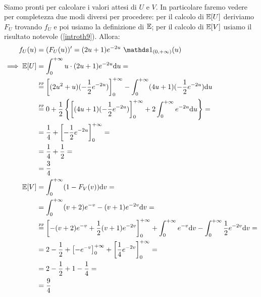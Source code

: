 \begin{enumerate}
\begin{gather*}
\end{gather*}
Siamo pronti per calcolare i valori attesi di $U$ e $V$. In particolare faremo vedere per completezza due modi diversi per procedere: per il calcolo di $\mathbb{E}[U]$ deriviamo $F_U$ trovando $f_U$ e poi usiamo la definizione di $\mathbb{E}$; per il calcolo di $\mathbb{E}[V]$ usiamo il risultato notevole (\ref{introth9}). Allora:
\begin{gather*}
\begin{aligned}
f_U(u)&=(F_U(u))'=(2u+1)e^{-2u}\ \Ind_{(0,+\infty)}(u) \\
\implies \EE[U]&=\int_{0}^{+\infty} u\cdot (2u+1)e^{-2u}\du =\\
&\overset{\underset{pp}{}}{=}\left[(2u^2+u)(-\frac{1}{2}e^{-2u})   \right]_0^{+\infty} -\int_{0}^{+\infty} (4u+1)(-\frac{1}{2}e^{-2u})\du \\
&\overset{\underset{pp}{}}{=}0+\frac{1}{2}\left\{\left[(4u+1)(-\frac{1}{2}e^{-2u})  \right]_0^{+\infty}+2\int_{0}^{+\infty} e^{-2u}\du   \right\}=\\
&=\frac{1}{4}+\left[ -\frac{1}{2}e^{-2u} \right]_0^{+\infty}=\\
&=\frac{1}{4}+\frac{1}{2}=\\
&=\frac{3}{4} \\
\EE[V]&=\int_{0}^{+\infty} (1-F_V(v))\dv=\\
&=\int_{0}^{+\infty} (v+2)e^{-v}-(v+1)e^{-2v}\dv=\\
&\overset{\underset{pp}{}}{=}\left[-(v+2)e^{-v}+\frac{1}{2}(v+1)e^{-2v}  \right]_0^{+\infty}+\int_{0}^{+\infty} e^{-v}\dv-\int_{0}^{+\infty} \frac{1}{2}e^{-2v}\dv=\\
&=2-\frac{1}{2}+\left[-e^{-v}  \right]_0^{+\infty}  + \left[\frac{1}{4}e^{-2v}  \right]_0^{+\infty}=\\
&=2-\frac{1}{2}+1-\frac{1}{4}=\\
&=\frac{9}{4}
\end{aligned}
\end{gather*}
\end{enumerate}

